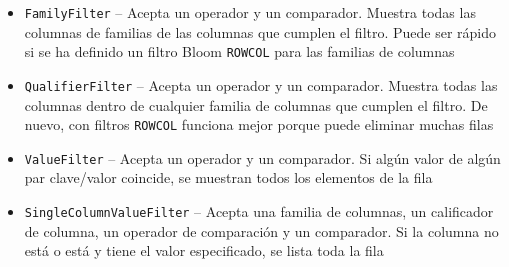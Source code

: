 \documentclass[14pt]{beamer}
\begin{document}
\begin{frame}
\begin{itemize}

\item {\tt FamilyFilter} -- Acepta un operador y un comparador. Muestra
  todas las columnas de familias de las columnas que cumplen el filtro.
  Puede ser rápido si se ha definido un filtro Bloom {\tt ROWCOL} para las
  familias de columnas

\item {\tt QualifierFilter} -- Acepta un operador y un comparador. Muestra
  todas las columnas dentro de cualquier familia de columnas que cumplen el
  filtro. De nuevo, con filtros {\tt ROWCOL} funciona mejor porque puede
  eliminar muchas filas




\item {\tt ValueFilter} -- Acepta un operador y un comparador. Si algún
  valor de algún par clave/valor coincide, se muestran todos los elementos
  de la fila


  \framebreak

\item {\tt SingleColumnValueFilter} -- Acepta una familia de columnas, un
  calificador de columna, un operador de comparación y un comparador. Si la
  columna no está o está y tiene el valor especificado, se lista toda la
  fila


\end{itemize}
\end{frame}
\end{document}
